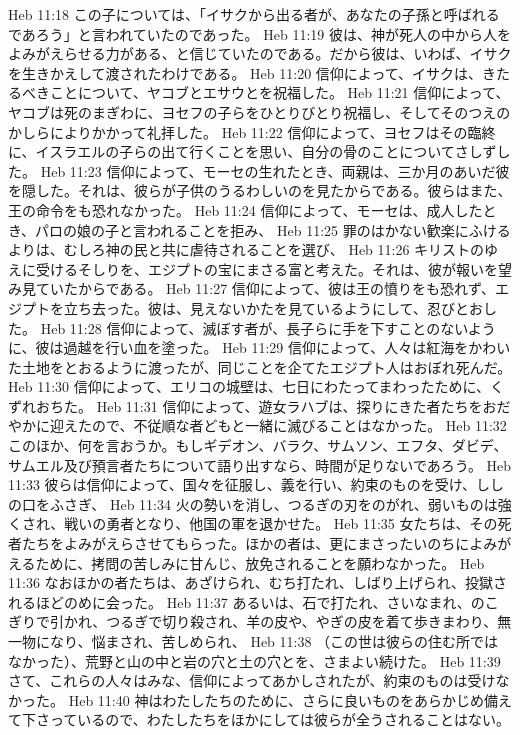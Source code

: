Heb 11:18  この子については、「イサクから出る者が、あなたの子孫と呼ばれるであろう」と言われていたのであった。
Heb 11:19  彼は、神が死人の中から人をよみがえらせる力がある、と信じていたのである。だから彼は、いわば、イサクを生きかえして渡されたわけである。
Heb 11:20  信仰によって、イサクは、きたるべきことについて、ヤコブとエサウとを祝福した。
Heb 11:21  信仰によって、ヤコブは死のまぎわに、ヨセフの子らをひとりびとり祝福し、そしてそのつえのかしらによりかかって礼拝した。
Heb 11:22  信仰によって、ヨセフはその臨終に、イスラエルの子らの出て行くことを思い、自分の骨のことについてさしずした。
Heb 11:23  信仰によって、モーセの生れたとき、両親は、三か月のあいだ彼を隠した。それは、彼らが子供のうるわしいのを見たからである。彼らはまた、王の命令をも恐れなかった。
Heb 11:24  信仰によって、モーセは、成人したとき、パロの娘の子と言われることを拒み、
Heb 11:25  罪のはかない歓楽にふけるよりは、むしろ神の民と共に虐待されることを選び、
Heb 11:26  キリストのゆえに受けるそしりを、エジプトの宝にまさる富と考えた。それは、彼が報いを望み見ていたからである。
Heb 11:27  信仰によって、彼は王の憤りをも恐れず、エジプトを立ち去った。彼は、見えないかたを見ているようにして、忍びとおした。
Heb 11:28  信仰によって、滅ぼす者が、長子らに手を下すことのないように、彼は過越を行い血を塗った。
Heb 11:29  信仰によって、人々は紅海をかわいた土地をとおるように渡ったが、同じことを企てたエジプト人はおぼれ死んだ。
Heb 11:30  信仰によって、エリコの城壁は、七日にわたってまわったために、くずれおちた。
Heb 11:31  信仰によって、遊女ラハブは、探りにきた者たちをおだやかに迎えたので、不従順な者どもと一緒に滅びることはなかった。
Heb 11:32  このほか、何を言おうか。もしギデオン、バラク、サムソン、エフタ、ダビデ、サムエル及び預言者たちについて語り出すなら、時間が足りないであろう。
Heb 11:33  彼らは信仰によって、国々を征服し、義を行い、約束のものを受け、ししの口をふさぎ、
Heb 11:34  火の勢いを消し、つるぎの刃をのがれ、弱いものは強くされ、戦いの勇者となり、他国の軍を退かせた。
Heb 11:35  女たちは、その死者たちをよみがえらさせてもらった。ほかの者は、更にまさったいのちによみがえるために、拷問の苦しみに甘んじ、放免されることを願わなかった。
Heb 11:36  なおほかの者たちは、あざけられ、むち打たれ、しばり上げられ、投獄されるほどのめに会った。
Heb 11:37  あるいは、石で打たれ、さいなまれ、のこぎりで引かれ、つるぎで切り殺され、羊の皮や、やぎの皮を着て歩きまわり、無一物になり、悩まされ、苦しめられ、
Heb 11:38  （この世は彼らの住む所ではなかった）、荒野と山の中と岩の穴と土の穴とを、さまよい続けた。
Heb 11:39  さて、これらの人々はみな、信仰によってあかしされたが、約束のものは受けなかった。
Heb 11:40  神はわたしたちのために、さらに良いものをあらかじめ備えて下さっているので、わたしたちをほかにしては彼らが全うされることはない。
